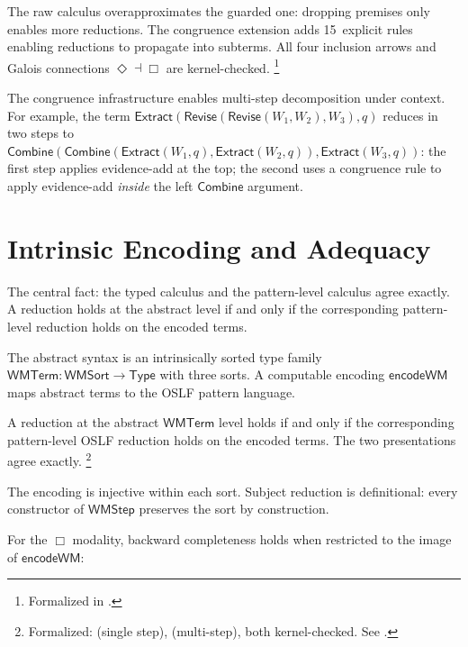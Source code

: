 \documentclass[11pt,openany]{report}
\begin{document}
\noindent
The raw calculus overapproximates the guarded one: dropping premises
only enables more reductions.  The congruence extension adds
15~explicit rules enabling reductions to propagate into subterms.
All four inclusion arrows and Galois connections
$\Diamond \dashv \Box$ are kernel-checked.%
\footnote{Formalized in
.}

The congruence infrastructure enables multi-step decomposition under
context.  For example, the term
$\mathsf{Extract}(\mathsf{Revise}(\mathsf{Revise}(W_1, W_2), W_3), q)$
reduces in two steps to
$\mathsf{Combine}(\mathsf{Combine}(\mathsf{Extract}(W_1, q),
\mathsf{Extract}(W_2, q)), \mathsf{Extract}(W_3, q))$:
the first step applies evidence-add at the top; the second uses a
congruence rule to apply evidence-add \emph{inside} the left
$\mathsf{Combine}$ argument.


\section{Intrinsic Encoding and Adequacy}

The central fact: the typed calculus and the pattern-level calculus
agree exactly.  A reduction holds at the abstract level if and only
if the corresponding pattern-level reduction holds on the encoded
terms.

The abstract syntax is an intrinsically sorted type family
$\mathsf{WMTerm} : \mathsf{WMSort} \to \mathsf{Type}$ with three
sorts.  A computable encoding $\mathsf{encodeWM}$ maps abstract
terms to the OSLF pattern language.

\begin{theorem}
A reduction at the abstract $\mathsf{WMTerm}$ level holds if and only
if the corresponding pattern-level OSLF reduction holds on the encoded
terms.  The two presentations agree exactly.%
\footnote{Formalized:  (single step),
 (multi-step), both kernel-checked.
See .}
\end{theorem}

\noindent
The encoding is injective within each sort.  Subject reduction is
definitional: every constructor of $\mathsf{WMStep}$ preserves the
sort by construction.

For the $\Box$ modality, backward completeness holds when restricted
to the image of $\mathsf{encodeWM}$:
\end{document}
